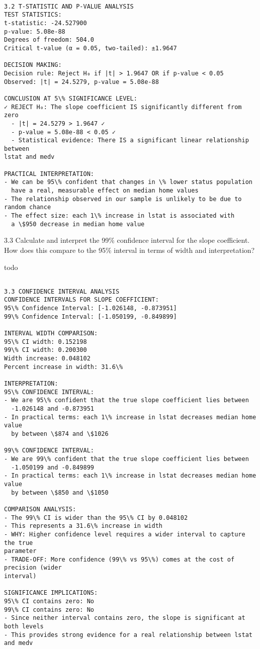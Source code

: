 \documentclass[11pt, twocolumn]{article}
\begin{document}
    \begin{Verbatim}[commandchars=\\\{\}]

3.2 T-STATISTIC AND P-VALUE ANALYSIS
TEST STATISTICS:
t-statistic: -24.527900
p-value: 5.08e-88
Degrees of freedom: 504.0
Critical t-value (α = 0.05, two-tailed): ±1.9647

DECISION MAKING:
Decision rule: Reject H₀ if |t| > 1.9647 OR if p-value < 0.05
Observed: |t| = 24.5279, p-value = 5.08e-88

CONCLUSION AT 5\% SIGNIFICANCE LEVEL:
✓ REJECT H₀: The slope coefficient IS significantly different from zero
  - |t| = 24.5279 > 1.9647 ✓
  - p-value = 5.08e-88 < 0.05 ✓
  - Statistical evidence: There IS a significant linear relationship between
lstat and medv

PRACTICAL INTERPRETATION:
- We can be 95\% confident that changes in \% lower status population
  have a real, measurable effect on median home values
- The relationship observed in our sample is unlikely to be due to random chance
- The effect size: each 1\% increase in lstat is associated with
  a \$950 decrease in median home value
    \end{Verbatim}

    3.3 Calculate and interpret the 99\% confidence interval for the slope
coefficient. How does this compare to the 95\% interval in terms of
width and interpretation?

todo

    \begin{Verbatim}[commandchars=\\\{\}]

3.3 CONFIDENCE INTERVAL ANALYSIS
CONFIDENCE INTERVALS FOR SLOPE COEFFICIENT:
95\% Confidence Interval: [-1.026148, -0.873951]
99\% Confidence Interval: [-1.050199, -0.849899]

INTERVAL WIDTH COMPARISON:
95\% CI width: 0.152198
99\% CI width: 0.200300
Width increase: 0.048102
Percent increase in width: 31.6\%

INTERPRETATION:
95\% CONFIDENCE INTERVAL:
- We are 95\% confident that the true slope coefficient lies between
  -1.026148 and -0.873951
- In practical terms: each 1\% increase in lstat decreases median home value
  by between \$874 and \$1026

99\% CONFIDENCE INTERVAL:
- We are 99\% confident that the true slope coefficient lies between
  -1.050199 and -0.849899
- In practical terms: each 1\% increase in lstat decreases median home value
  by between \$850 and \$1050

COMPARISON ANALYSIS:
- The 99\% CI is wider than the 95\% CI by 0.048102
- This represents a 31.6\% increase in width
- WHY: Higher confidence level requires a wider interval to capture the true
parameter
- TRADE-OFF: More confidence (99\% vs 95\%) comes at the cost of precision (wider
interval)

SIGNIFICANCE IMPLICATIONS:
95\% CI contains zero: No
99\% CI contains zero: No
- Since neither interval contains zero, the slope is significant at both levels
- This provides strong evidence for a real relationship between lstat and medv
    \end{Verbatim}
\end{document}
